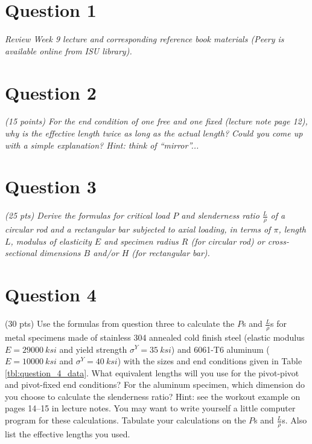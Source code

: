 \documentclass[12 pt]{article}
\begin{document}
\section*{Question 1}
\textit{Review Week \num{9} lecture and corresponding reference book materials (Peery is available online from ISU library).}


\section*{Question 2}
\textit{(\num{15} points) For the end condition of one free and one fixed (lecture note page \num{12}), why is the effective length twice as long as the actual length? Could you come up with a simple explanation? Hint: think of “mirror”...}


\section*{Question 3}
\textit{(\num{25} pts) Derive the formulas for critical load $P$ and slenderness ratio $\frac{L}{\rho}$ of a circular rod and a rectangular bar subjected to axial loading, in terms of $\pi$, length $L$, modulus of elasticity $E$ and specimen radius $R$ (for circular rod) or cross-sectional dimensions $B$ and/or $H$ (for rectangular bar).}


\section*{Question 4}
(\num{30} pts) Use the formulas from question three to calculate the $P$s and $\frac{L}{\rho}$s for metal specimens made of stainless 304 annealed cold finish steel (elastic modulus $E=\qty{29000}{ksi}$ and yield strength $\sigma^Y=\qty{35}{ksi}$) and 6061-T6 aluminum ($E=\qty{10000}{ksi}$ and $\sigma^Y=\qty{40}{ksi}$) with the sizes and end conditions given in Table \ref{tbl:question_4_data}. What equivalent lengths will you use for the pivot-pivot and pivot-fixed end conditions? For the  aluminum specimen, which dimension do you choose to calculate the slenderness ratio? Hint: see the workout example on pages \numrange{14}{15} in lecture notes. You may want to write yourself a little computer program for these calculations. Tabulate your calculations on the $P$s and $\frac{L}{\rho}$s. Also list the effective lengths you used.
\end{document}
